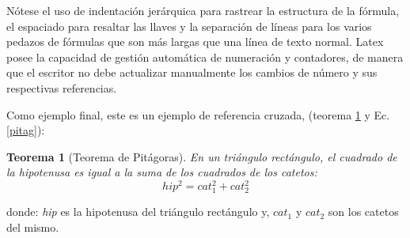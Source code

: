 \documentclass[12pt,a4paper]{article}
\newtheorem{teorema}{Teorema}
\begin{document}
Nótese el uso de indentación jerárquica para rastrear la estructura de la fórmula, el espaciado para resaltar las llaves y la separación de líneas para los varios pedazos de fórmulas que son más largas que una línea de texto normal. Latex posee la capacidad de gestión automática de numeración y contadores, de manera que el escritor no debe actualizar manualmente los cambios de número y sus respectivas referencias.

Como ejemplo final, este es un ejemplo de referencia cruzada, (teorema \ref{Pitag} y Ec. \ref{pitag}):

\begin{teorema}[Teorema de Pitágoras]
En un triángulo rectángulo, el cuadrado de la hipotenusa es igual a la suma de los cuadrados de los catetos:
\begin{equation}
hip^2 = cat_1^2 + cat_2^2
\label{pitag}
\end{equation}
\label{Pitag}
\end{teorema}
donde: \textit{hip} es la hipotenusa del triángulo rectángulo y, $ cat_1 $ y $ cat_2 $ son los catetos del mismo.




\end{document}
